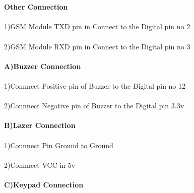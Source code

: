 \paragraph{}

\textbf{\\Other Connection}
\paragraph{} 1)GSM Module TXD pin in Connect to the Digital pin no 2 
\paragraph{} 2)GSM Module RXD pin in Connect to the Digital pin no 3 
\paragraph{}
\textbf{A)Buzzer Connection}
\paragraph{}1)Connnect Positive pin of Buzzer to the Digital pin no 12
\paragraph{}2)Connnect Negative pin of Buzzer to the Digital pin 3.3v
\paragraph{}
\textbf{B)Lazer Connection}
\paragraph{}1)Connnect Pin Ground to Ground
\paragraph{}2)Connnect VCC in 5v
\paragraph{}
\textbf{C)Keypad Connection}
